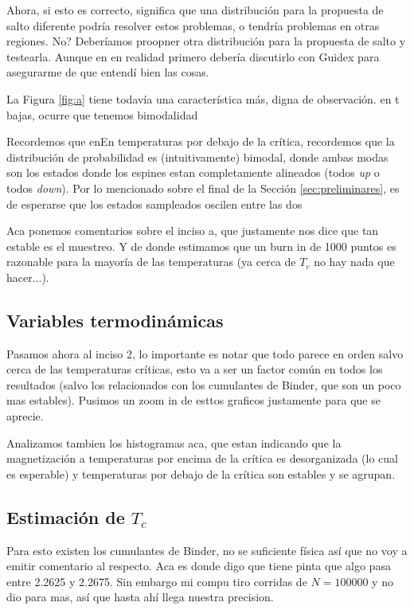 \documentclass[a4paper,12pt]{article}
\begin{document}
Ahora, si esto es correcto, significa que una distribución para la propuesta de salto diferente podría resolver estos problemas, o tendría problemas en otras regiones. No? Deberíamos proopner otra distribución para la propuesta de salto y testearla. Aunque en en realidad primero debería discutirlo con Guidex para asegurarme de que entendí bien las cosas.

La Figura \ref{fig:a} tiene todavía una característica más, digna de observación. en t bajas, ocurre que tenemos bimodalidad

Recordemos que enEn temperaturas por debajo de la crítica, recordemos que la distribución de probabilidad es (intuitivamente) bimodal, donde ambas modas son los estados donde los espines estan completamente alineados (todos {\it up} o todos {\it down}). Por lo mencionado sobre el final de la Sección \ref{sec:preliminares}, es de esperarse que los estados sampleados oscilen entre las dos 

Aca ponemos comentarios sobre el inciso a, que justamente nos dice que tan estable es el muestreo. Y de donde estimamos que un burn in de 1000 puntos es razonable para la mayoría de las temperaturas (ya cerca de $T_c$ no hay nada que hacer...).

\subsection{Variables termodinámicas}

Pasamos ahora al inciso 2, lo importante es notar que todo parece en orden salvo cerca de las temperaturas críticas, esto va a ser un factor común en todos los resultados (salvo los relacionados con los cumulantes de Binder, que son un poco mas estables). Pusimos un zoom in de esttos graficos justamente para que se aprecie.

Analizamos tambien los histogramas aca, que estan indicando que la magnetización a temperaturas por encima de la crítica es desorganizada (lo cual es esperable) y temperaturas por debajo de la crítica son estables y se agrupan.

\subsection{Estimación de $T_c$}

Para esto existen los cumulantes de Binder, no se suficiente física así que no voy a emitir comentario al respecto. Aca es donde digo que tiene pinta que algo pasa entre 2.2625 y 2.2675. Sin embargo mi compu tiro corridas de $N = 100000$ y no dio para mas, así que hasta ahí llega nuestra precision.
\end{document}
